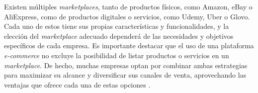 Existen múltiples \textit{marketplaces}, tanto de productos físicos, como Amazon, eBay o AliExpress, como de productos digitales o servicios, como Udemy, Uber o Glovo. Cada uno de estos tiene sus propias características y funcionalidades, y la elección del \textit{marketplace} adecuado dependerá de las necesidades y objetivos específicos de cada empresa. Es importante destacar que el uso de una plataforma \textit{e-commerce} no excluye la posibilidad de listar productos o servicios en un \textit{marketplace}. De hecho, muchas empresas optan por combinar ambas estrategias para maximizar su alcance y diversificar sus canales de venta, aprovechando las ventajas que ofrece cada una de estas opciones \cite{sharetribe_marketplac_platforms}.